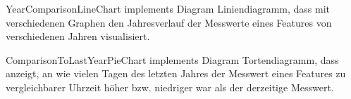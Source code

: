     \begin{Class}{YearComparisonLineChart implements Diagram}
        Liniendiagramm, dass mit verschiedenen Graphen den Jahresverlauf der Messwerte eines Features von verschiedenen Jahren visualisiert.
    \end{Class}

    \begin{Class}{ComparisonToLastYearPieChart implements Diagram}
        Tortendiagramm, dass anzeigt, an wie vielen Tagen des letzten Jahres der Messwert eines Features zu vergleichbarer Uhrzeit höher bzw. niedriger war als der derzeitige Messwert.
    \end{Class}



